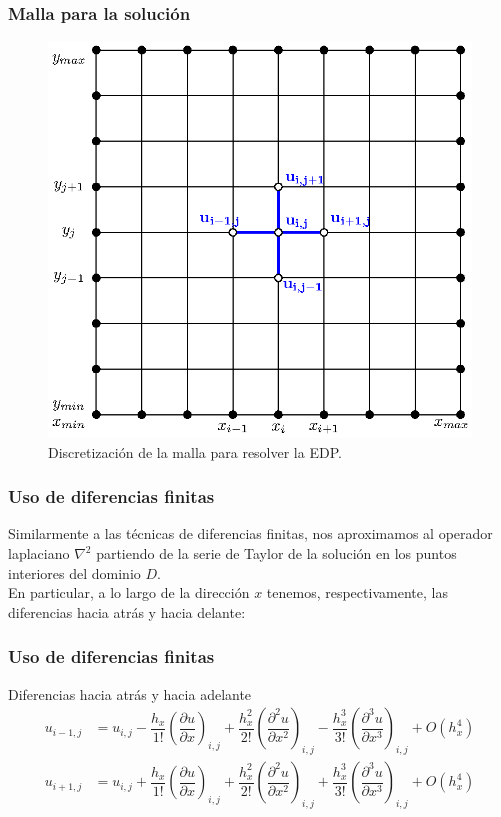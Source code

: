 \documentclass[12pt]{beamer}
\begin{document}
\begin{frame}
\frametitle{Malla para la solución}
\captionsetup{font=small,labelfont=small}
\begin{figure}
	\centering
	\includegraphics[scale=0.6]{Imagenes/mallaSolucionEDP_01.eps}
	\caption{Discretización de la malla para resolver la EDP.}
	\label{fig:figura_01}
\end{figure}
\end{frame}
\begin{frame}
\frametitle{Uso de diferencias finitas}
Similarmente a las técnicas de diferencias finitas, nos aproximamos al operador laplaciano $\nabla^{2}$ partiendo de la serie de Taylor de la solución en los puntos interiores del dominio $D$.
\\
\bigskip
En particular, a lo largo de la dirección $x$ tenemos, respectivamente, las diferencias hacia atrás y hacia delante:
\end{frame}
\begin{frame}
\frametitle{Uso de diferencias finitas}
Diferencias hacia atrás y hacia adelante
\fontsize{12}{12}\selectfont
\begin{align*}
u_{i-1, j} &= u_{i, j} - \dfrac{h_{x}}{1!} \left( \dfrac{\partial u}{\partial x} \right)_{i, j} + \dfrac{h_{x}^{2}}{2!} \left( \dfrac{\partial^{2} u}{\partial x^{2}} \right)_{i, j} - \dfrac{h_{x}^{3}}{3!} \left( \dfrac{\partial^{3} u}{\partial x^{3}} \right)_{i, j} + O(h_{x}^{4})  \\
u_{i+1, j} &= u_{i, j} + \dfrac{h_{x}}{1!} \left( \dfrac{\partial u}{\partial x} \right)_{i, j} + \dfrac{h_{x}^{2}}{2!} \left( \dfrac{\partial^{2} u}{\partial x^{2}} \right)_{i, j} + \dfrac{h_{x}^{3}}{3!} \left( \dfrac{\partial^{3} u}{\partial x^{3}} \right)_{i, j} + O(h_{x}^{4})
\end{align*}
\end{frame}
\end{document}
